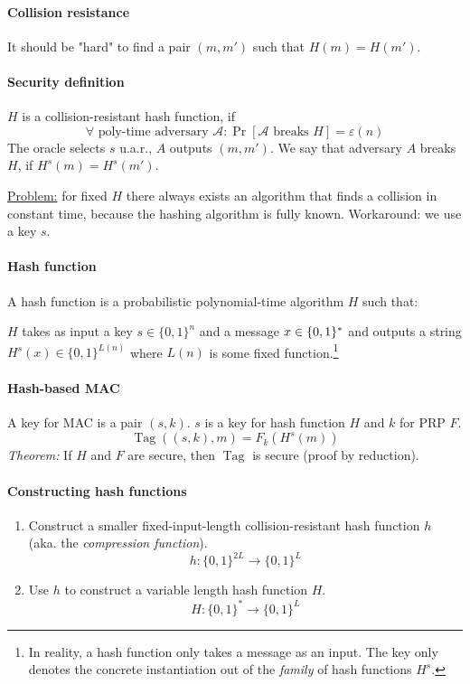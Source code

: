 \paragraph{Collision resistance} It should be "hard" to find a pair $(m, m')$ such that $H(m) = H(m')$.

\paragraph{Security definition} $H$ is a collision-resistant hash function, if 
$$\forall \text{ poly-time adversary }\mathcal{A}: \Pr[\mathcal{A} \text{ breaks } H] = \varepsilon(n)$$
The oracle selects $s$ u.a.r., $A$ outputs $(m, m')$. We say that adversary $A$ breaks $H$, if $H^s(m) = H^s(m')$.

\underline{Problem:} for fixed $H$ there always exists an algorithm that finds a collision in constant time, because the hashing algorithm is fully known. Workaround: we use a key $s$.

\paragraph{Hash function} A hash function is a probabilistic polynomial-time algorithm $H$ such that:

$H$ takes as input a key $s \in \{0, 1\}^n$ and a message $x \in \lbrace 0, 1 \rbrace^*$ and outputs a string $H^s(x) \in \{0,1\}^{L(n)}$ where $L(n)$ is some fixed function.\footnote{In reality, a hash function only takes a message as an input. The key only denotes the concrete instantiation out of the \textit{family} of hash functions $H^s$.}

\paragraph{Hash-based MAC} A key for MAC is a pair $(s, k)$. $s$ is a key for hash function $H$ and $k$ for PRP $F$. 
$$\operatorname{Tag}((s, k), m) = F_k(H^s(m))$$
\textit{Theorem:} If $H$ and $F$ are secure, then $\operatorname{Tag}$ is secure (proof by reduction).

\paragraph{Constructing hash functions} 

\begin{enumerate}
    \item Construct a smaller fixed-input-length collision-resistant hash function $h$ (aka. the \textit{compression function}). 
        $$h: \{0, 1\}^{2L} \rightarrow \{0,1\}^L$$
    \item Use $h$ to construct a variable length hash function $H$.
        $$H: \{0, 1\}^{*} \rightarrow \{0,1\}^L$$
\end{enumerate}

